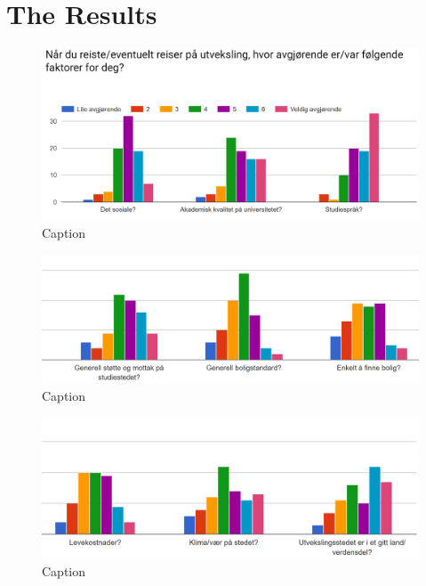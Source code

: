 \FloatBarrier
\section*{The Results}

\begin{figure}[h]
    \centering
    \includegraphics[width=1\textwidth]{fig/form1/results/slide1.PNG}
    \caption[]{Caption}
    \label{fig:my_label}
\end{figure}

\begin{figure}[h]
    \centering
    \includegraphics[width=1\textwidth]{fig/form1/results/slide2.PNG}
    \caption[]{Caption}
    \label{fig:my_label}
\end{figure}

\begin{figure}[h]
    \centering
    \includegraphics[width=1\textwidth]{fig/form1/results/slide3.PNG}
    \caption[]{Caption}
    \label{fig:my_label}
\end{figure}


